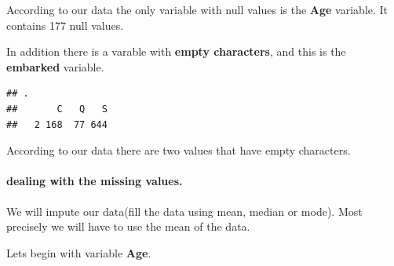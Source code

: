 \documentclass[
]{article}
\newenvironment{Shaded}{\begin{snugshade}}{\end{snugshade}}
\newcommand{\AttributeTok}[1]{\textcolor[rgb]{0.13,0.29,0.53}{#1}}
\newcommand{\CommentTok}[1]{\textcolor[rgb]{0.56,0.35,0.01}{\textit{#1}}}
\newcommand{\DecValTok}[1]{\textcolor[rgb]{0.00,0.00,0.81}{#1}}
\newcommand{\FloatTok}[1]{\textcolor[rgb]{0.00,0.00,0.81}{#1}}
\newcommand{\FunctionTok}[1]{\textcolor[rgb]{0.13,0.29,0.53}{\textbf{#1}}}
\newcommand{\NormalTok}[1]{#1}
\newcommand{\OtherTok}[1]{\textcolor[rgb]{0.56,0.35,0.01}{#1}}
\newcommand{\SpecialCharTok}[1]{\textcolor[rgb]{0.81,0.36,0.00}{\textbf{#1}}}
\begin{document}
According to our data the only variable with null values is the
\textbf{Age} variable. It contains 177 null values.

In addition there is a varable with \textbf{empty characters}, and this
is the \textbf{embarked} variable.

\begin{Shaded}
\end{Shaded}

\begin{verbatim}
## .
##       C   Q   S 
##   2 168  77 644
\end{verbatim}

According to our data there are two values that have empty characters.

\hypertarget{dealing-with-the-missing-values.}{%
\paragraph{dealing with the missing
values.}\label{dealing-with-the-missing-values.}}

We will impute our data(fill the data using mean, median or mode). Most
precisely we will have to use the mean of the data.

Lets begin with variable \textbf{Age}.

\begin{Shaded}
\end{Shaded}
\end{document}
